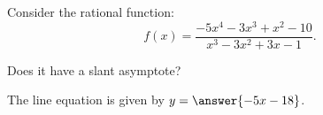\documentclass{ximera}
\author{Ivo Terek}
\begin{document}
\begin{exercise}


  Consider the rational function:
$$  f(x) = \frac{-5x^4-3x^3+x^2-10}{x^3-3x^2+3x-1}. $$

  Does it have a slant asymptote?

  \begin{multipleChoice}
  \end{multipleChoice}

  \begin{exercise}
    The line equation is given by $y= \answer{-5x-18}$.
  \end{exercise}

\end{exercise}
\end{document}
